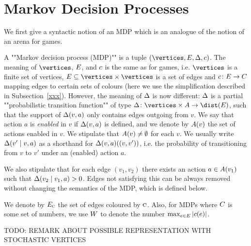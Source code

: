 \section*{Markov Decision Processes}

We first give a syntactic notion of an MDP which is an analogue of the notion of an arena for games.

\begin{definition}[""MDP""]
\label{5-def:MDP}
A ""Markov decision process (MDP)"" is a tuple $(\vertices,\edges,\probTranFunc,\colouring)$. The meaning of $\vertices$, $E$, and $c$ is the same as for games, i.e. $\vertices$ is a finite set of vertices, $\edges\subseteq \vertices\times\vertices$ is a set of edges and $c\colon E \rightarrow C$ mapping edges to certain sets of colours (here we use the simplification described in Subsection~\ref{xxx}). However, the meaning of $\Delta$ is now different: $\Delta$ is a partial ""probabilistic transition function"" of type $\probTranFunc\colon \vertices \times \actions \rightarrow \dist(\edges)$, such that the support of $\Delta(v,a)$ only contains edges outgoing from $v$. We say that action $a$ is \emph{enabled} in $v$ if $\Delta(v,a)$ is defined, and we denote by $A(v)$ the set of actions enabled in $v$. We stipulate that $A(v)\neq \emptyset$ for each $v$. We usually write $\Delta(v'\mid v,a)$ as a shorthand for $\Delta(v,a)((v,v'))$, i.e. the probability of transitioning from $v$ to $v'$ under an (enabled) action $a$.
\end{definition}

We also stipulate that for each edge $(v_1,v_2)$ there exists an action $a\in A(v_1)$ such that $\Delta(v_2\mid v_1,a)>0$. Edges not satisfying this can be always removed without changing the semantics of the MDP, which is defined below.

We denote by $E_{\textsc{c}}$ the set of edges coloured by $\textsc{c}$. Also, for MDPs where $C$ is some set of numbers, we use $W$ to denote the number $\max_{e\in 
	E}|c(e)|$.


\begin{remark}
	TODO: REMARK ABOUT POSSIBLE REPRESENTATION WITH STOCHASTIC VERTICES
\end{remark}

